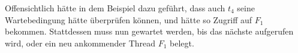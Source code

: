 \noindent
Offensichtlich hätte in dem Beispiel  dazu geführt, dass auch $t_4$ seine Wartebedingung hätte überprüfen können, und hätte so Zugriff auf $F_1$ bekommen.
Stattdessen muss nun gewartet werden, bis das nächste  aufgerufen wird, oder ein neu ankommender Thread $F_1$ belegt.
